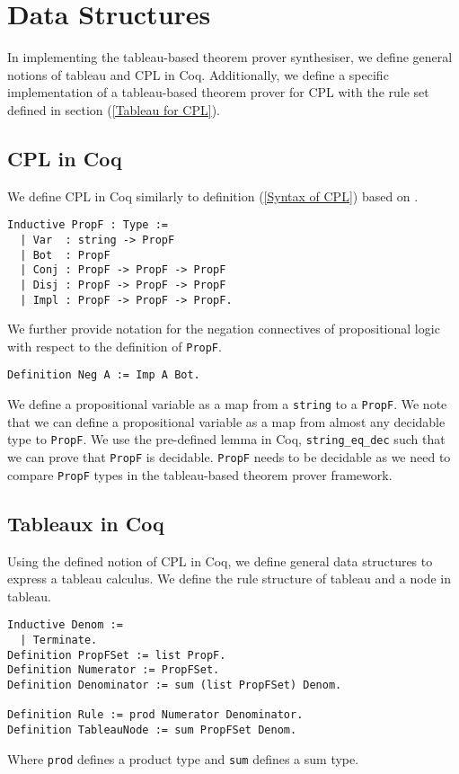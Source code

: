 \documentclass{llncs}
\begin{document}
\section{Data Structures}
%
In implementing the tableau-based theorem prover synthesiser, we define general
notions of tableau and CPL in Coq. Additionally, we define a specific
implementation of a tableau-based theorem prover for CPL with the rule set
defined in section (\ref{Tableau for CPL}).
%
\subsection{CPL in Coq}
%
We define CPL in Coq similarly to definition (\ref{Syntax of CPL}) based on
\cite{van2015propositional}.
%
\begin{verbatim}
Inductive PropF : Type :=
  | Var  : string -> PropF
  | Bot  : PropF
  | Conj : PropF -> PropF -> PropF
  | Disj : PropF -> PropF -> PropF
  | Impl : PropF -> PropF -> PropF.
\end{verbatim}
%
We further provide notation for the negation connectives of propositional
logic with respect to the definition of \verb+PropF+.
%
\begin{verbatim}
Definition Neg A := Imp A Bot.
\end{verbatim}
%
We define a propositional variable as a map from a \verb+string+ to a
\verb+PropF+. We note that we can define a propositional variable as a map from
almost any decidable type to \verb+PropF+. We use the pre-defined lemma in Coq,
\verb+string_eq_dec+ such that we can prove that \verb+PropF+ is decidable.
\verb+PropF+ needs to be decidable as we need to compare \verb+PropF+ types in
the tableau-based theorem prover framework.
%
\subsection{Tableaux in Coq}
%
Using the defined notion of CPL in Coq, we define general data structures to
express a tableau calculus. We define the rule structure of tableau and a node
in tableau.
%
\begin{verbatim}
Inductive Denom :=
  | Terminate.
Definition PropFSet := list PropF.
Definition Numerator := PropFSet.
Definition Denominator := sum (list PropFSet) Denom.

Definition Rule := prod Numerator Denominator.
Definition TableauNode := sum PropFSet Denom.
\end{verbatim}
%
Where \verb+prod+ defines a product type and \verb+sum+ defines a sum type.
\end{document}
